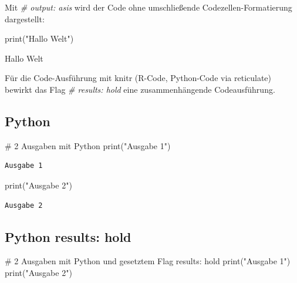 \documentclass[
  letterpaper,
  DIV=11]{scrartcl}
\newenvironment{Shaded}{\begin{snugshade}}{\end{snugshade}}
\newcommand{\BuiltInTok}[1]{\textcolor[rgb]{0.00,0.23,0.31}{#1}}
\newcommand{\CommentTok}[1]{\textcolor[rgb]{0.37,0.37,0.37}{#1}}
\newcommand{\NormalTok}[1]{\textcolor[rgb]{0.00,0.23,0.31}{#1}}
\newcommand{\StringTok}[1]{\textcolor[rgb]{0.13,0.47,0.30}{#1}}
\begin{document}
Mit \emph{\#\textbar{} output: asis} wird der Code ohne umschließende
Codezellen-Formatierung dargestellt:

\begin{Shaded}
\begin{Highlighting}[]
\BuiltInTok{print}\NormalTok{(}\StringTok{"Hallo Welt"}\NormalTok{)}
\end{Highlighting}
\end{Shaded}

Hallo Welt

Für die Code-Ausführung mit knitr (R-Code, Python-Code via reticulate)
bewirkt das Flag \emph{\#\textbar{} results: hold} eine zusammenhängende
Codeausführung.

\subsection{Python}

\begin{Shaded}
\begin{Highlighting}[]
\CommentTok{\# 2 Ausgaben mit Python}
\BuiltInTok{print}\NormalTok{(}\StringTok{"Ausgabe 1"}\NormalTok{)}
\end{Highlighting}
\end{Shaded}

\begin{verbatim}
Ausgabe 1
\end{verbatim}

\begin{Shaded}
\begin{Highlighting}[]
\BuiltInTok{print}\NormalTok{(}\StringTok{"Ausgabe 2"}\NormalTok{)}
\end{Highlighting}
\end{Shaded}

\begin{verbatim}
Ausgabe 2
\end{verbatim}

\subsection{Python results: hold}

\begin{Shaded}
\begin{Highlighting}[]
\CommentTok{\# 2 Ausgaben mit Python und gesetztem Flag results: hold}
\BuiltInTok{print}\NormalTok{(}\StringTok{"Ausgabe 1"}\NormalTok{)}
\BuiltInTok{print}\NormalTok{(}\StringTok{"Ausgabe 2"}\NormalTok{)}
\end{Highlighting}
\end{Shaded}
\end{document}
